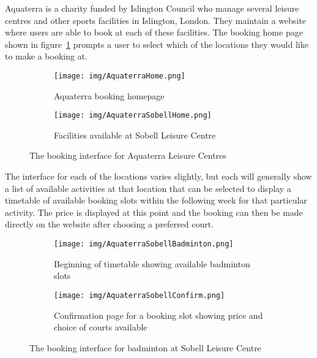 Aquaterra is a charity funded by Islington Council who manage several leisure centres and other sports facilities in Islington, London. They maintain a website\cite{AquaterraLeisure} where users are able to book at each of these facilities. The booking home page shown in figure~\ref{fig:AquaterraHome} prompts a user to select which of the locations they would like to make a booking at.

\begin{figure}[ht]
\centering
\begin{subfigure}[b]{0.4\textwidth}
                   \texttt{[image: img/AquaterraHome.png]}
                   \caption{Aquaterra booking homepage}\label{fig:AquaterraHome}
\end{subfigure}
\qquad
\begin{subfigure}[b]{0.4\textwidth}
                   \texttt{[image: img/AquaterraSobellHome.png]}
                   \caption{Facilities available at Sobell Leisure Centre}\label{fig:AquaterraSobellHome}
\end{subfigure}
\qquad
\caption{The booking interface for Aquaterra Leisure Centres}\label{fig:AquaterraHomeMain}
\end{figure}

The interface for each of the locations varies slightly, but each will generally show a list of available activities at that location that can be selected to display a timetable of available booking slots within the following week for that particular activity. The price is displayed at this point and the booking can then be made directly on the website after choosing a preferred court.

\begin{figure}[ht]
\centering
\begin{subfigure}[b]{0.45\textwidth}
\texttt{[image: img/AquaterraSobellBadminton.png]}
\caption{Beginning of timetable showing available badminton slots}\label{fig:AquaterraSobellBadminton}
            \end{subfigure}
            \qquad
\begin{subfigure}[b]{0.45\textwidth}
\texttt{[image: img/AquaterraSobellConfirm.png]}
\caption{Confirmation page for a booking slot showing price and choice of courts available}\label{fig:AquaterraSobellConfirm}
            \end{subfigure}
            \qquad
\caption{The booking interface for badminton at Sobell Leisure Centre}\label{fig:AquaterraSobellBadmintonMain}
\end{figure}

